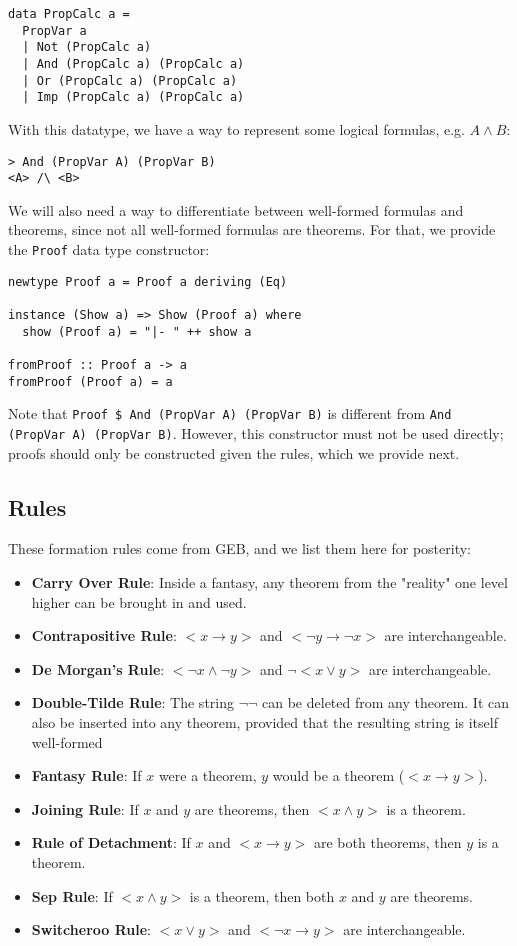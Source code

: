 \documentclass{article}
\begin{document}
\begin{lstlisting}
data PropCalc a =
  PropVar a
  | Not (PropCalc a)
  | And (PropCalc a) (PropCalc a)
  | Or (PropCalc a) (PropCalc a)
  | Imp (PropCalc a) (PropCalc a)
\end{lstlisting}

With this datatype, we have a way to represent some logical formulas, e.g. $A \land B$:

\begin{lstlisting}
> And (PropVar A) (PropVar B)
<A> /\ <B>
\end{lstlisting}

We will also need a way to differentiate between well-formed formulas and theorems, since not all well-formed formulas are theorems. For that, we provide the \texttt{Proof} data type constructor:

\begin{lstlisting}
newtype Proof a = Proof a deriving (Eq)

instance (Show a) => Show (Proof a) where
  show (Proof a) = "|- " ++ show a

fromProof :: Proof a -> a
fromProof (Proof a) = a
\end{lstlisting}

Note that \texttt{Proof \$ And (PropVar A) (PropVar B)} is different from \texttt{And (PropVar A) (PropVar B)}. However, this constructor must not be used directly; proofs should only be constructed given the rules, which we provide next.

\subsection{Rules}

These formation rules come from GEB, and we list them here for posterity:

\begin{itemize}
\item \textbf{Carry Over Rule}: Inside a fantasy, any theorem from the "reality" one level higher can be brought in and used.
\item \textbf{Contrapositive Rule}: $< x \to y>$ and $< \neg y \to \neg x>$ are interchangeable.
\item \textbf{De Morgan's Rule}: $< \neg x \land \neg y>$ and $\neg<x \lor y>$ are interchangeable.
\item \textbf{Double-Tilde Rule}: The string $\neg\neg$ can be deleted from any theorem. It can also be inserted into any theorem, provided that the resulting string is itself well-formed
\item \textbf{Fantasy Rule}: If $x$ were a theorem, $y$ would be a theorem ($<x \to y>$).
\item \textbf{Joining Rule}: If $x$ and $y$ are theorems, then $<x \land y>$ is a theorem.
\item \textbf{Rule of Detachment}: If $x$ and $<x \to y>$ are both theorems, then $y$ is a theorem.
\item \textbf{Sep Rule}: If $<x \land y>$ is a theorem, then both $x$ and $y$ are theorems.
\item \textbf{Switcheroo Rule}: $<x \lor y>$ and $<\neg x \to y>$ are interchangeable.
\end{itemize}
\end{document}
